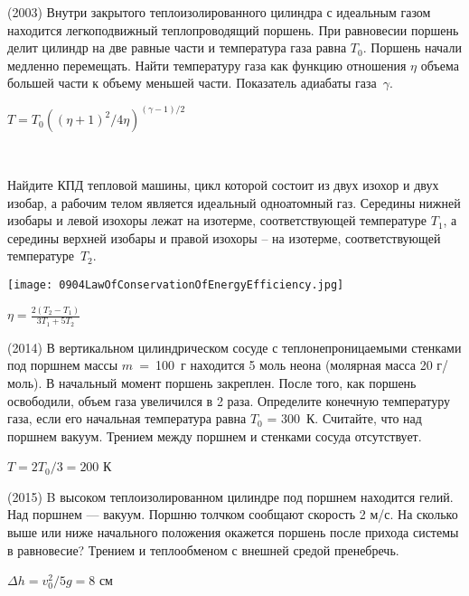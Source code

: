 \begin{ex}
(2003) Внутри закрытого теплоизолированного цилиндра с идеальным газом находится легкоподвижный теплопроводящий поршень. 
При равновесии поршень делит цилиндр на две равные части и температура газа равна $T_0$. Поршень начали медленно перемещать. 
Найти температуру газа как функцию отношения $\eta$ объема большей части к объему меньшей части. Показатель адиабаты газа~$\gamma$.
\begin{ans}
$T=T_0 \left( (\eta + 1)^2/4 \eta \right)^{(\gamma-1)/2}$
\end{ans}
\end{ex}

\begin{ex}
\hspace{0pt} \\
\begin{minipage}{.65\textwidth}
Найдите КПД тепловой машины, цикл которой состоит из двух изохор и двух изобар, а рабочим телом является идеальный одноатомный газ. 
Середины нижней изобары и левой изохоры лежат на изотерме, соответствующей температуре $T_1$, 
а середины верхней изобары и правой изохоры -- на изотерме, соответствующей температуре~$T_2$.
\end{minipage}
\begin{minipage}{.35\textwidth}
\centering
\texttt{[image: 0904LawOfConservationOfEnergyEfficiency.jpg]}
\end{minipage}
\begin{ans}
$\eta = \frac{2(T_2-T_1)}{3T_1+5T_2}$
\end{ans}
\end{ex}

\begin{ex}
(2014) В вертикальном цилиндрическом сосуде с теплонепроницаемыми стенками под поршнем массы $m$~=~100~г находится 5 моль неона 
(молярная масса 20 г/моль). В начальный момент поршень закреплен. После того, как поршень освободили, объем газа увеличился в 2 раза. 
Определите конечную температуру газа, если его начальная температура равна $T_0$ = 300~К. Считайте, что над поршнем вакуум. 
Трением между поршнем и стенками сосуда отсутствует.
\begin{ans}
$T=2T_0/3 = 200$ К
\end{ans}
\end{ex}

\begin{ex}
(2015) B высоком теплоизолированном цилиндре под поршнем находится гелий. Над поршнем — вакуум. Поршню толчком сообщают скорость 2 м/с. На сколько выше или ниже начального положения окажется поршень после прихода системы в равновесие? Трением и теплообменом с внешней средой пренебречь.
\begin{ans}
$\Delta h = v_0^2 / 5g = 8$ см
\end{ans}
\end{ex}

